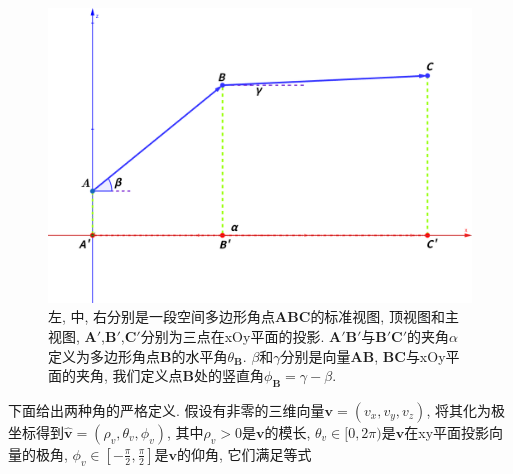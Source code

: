 \documentclass[utf8]{ctexart} %
\numberwithin{figure}{section}
\numberwithin{equation}{section}
\begin{document}
\begin{figure}[ht]
\begin{minipage}[b]{0.33\textwidth}
 		\includegraphics[width=\textwidth]{figures/explain_angle_front.png}
 	\end{minipage}

	 	\caption{\small{左, 中, 右分别是一段空间多边形角点$\boldsymbol{ABC}$的标准视图, 顶视图和主视图,  $\boldsymbol{A}'$,$\boldsymbol{B}'$,$\boldsymbol{C}'$分别为三点在xOy平面的投影. $\boldsymbol{A}'\boldsymbol{B}'$与$\boldsymbol{B}'\boldsymbol{C}'$的夹角$\alpha$定义为多边形角点$\boldsymbol{B}$的水平角$\theta_{\boldsymbol{B}}$. $\beta$和$\gamma$分别是向量$\boldsymbol{AB}$, $\boldsymbol{BC}$与xOy平面的夹角, 我们定义点$\boldsymbol{B}$处的竖直角$\phi_{\boldsymbol{B}}=\gamma-\beta$. }}
	 	 \label{explain}
	 \end{figure}
	  下面给出两种角的严格定义. 假设有非零的三维向量$\boldsymbol{v}=(v_x,v_y,v_z)$, 将其化为极坐标得到$\hat{\boldsymbol{v}}=(\rho_v,\theta_v,\phi_v)$, 其中$\rho_v>0$是$\boldsymbol{v}$的模长, $\theta_v\in[0,2\pi)$是$\boldsymbol{v}$在xy平面投影向量的极角, $\phi_v\in[-\frac{\pi}2,\frac{\pi}2]$是$\boldsymbol{v}$的仰角, 它们满足等式
\end{document}
